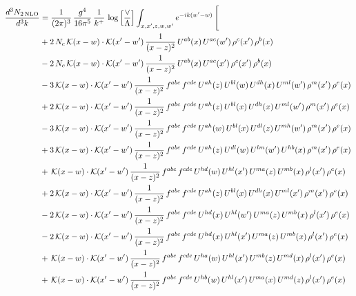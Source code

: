 \documentclass[9pt]{article}
\numberwithin{equation}{section}
\begin{document}
\begin{align}
\frac{d^{3}N_{2\,\mathrm{NLO}}}{d^{3}k} & = \frac{1}{(2\pi)^{3}}\,\frac{g^{4}}{16\pi^{5}}\,\frac{1}{k^{+}}\,\log\Big[\frac{\vee}{\Lambda}\Big]\int_{x,x',z,w,w'}e^{-ik(w'-w)}\,\Bigg[
\notag\\ &+2\,N_{c}\,\mathcal{K}(x-w)\cdot\mathcal{K}(x'-w')\,\frac{1}{(x-z)^{2}}\,U^{ab}(x)\,U^{ac}(w')\,\rho^{c}(x')\,\rho^{b}(x)\notag\\
&-2\,N_{c}\,\mathcal{K}(x-w)\cdot\mathcal{K}(x'-w')\,\frac{1}{(x-z)^{2}}\,U^{ab}(x)\,U^{ac}(x')\,\rho^{c}(x')\,\rho^{b}(x)\notag\\
&-3\,\mathcal{K}(x-w)\cdot\mathcal{K}(x'-w')\,\frac{1}{(x-z)^{2}}\,f^{abc}\,f^{cde}\,U^{ah}(z)\,U^{bl}(w)\,U^{dh}(x)\,U^{ml}(w')\,\rho^{m}(x')\,\rho^{e}(x)\notag\\
&+2\,\mathcal{K}(x-w)\cdot\mathcal{K}(x'-w')\,\frac{1}{(x-z)^{2}}\,f^{abc}\,f^{cde}\,U^{ah}(z)\,U^{bl}(x)\,U^{dh}(x)\,U^{ml}(w')\,\rho^{m}(x')\,\rho^{e}(x)\notag\\
&-3\,\mathcal{K}(x-w)\cdot\mathcal{K}(x'-w')\,\frac{1}{(x-z)^{2}}\,f^{abc}\,f^{cde}\,U^{ah}(w)\,U^{bl}(x)\,U^{dl}(z)\,U^{mh}(w')\,\rho^{m}(x')\,\rho^{e}(x)\notag\\
&+3\,\mathcal{K}(x-w)\cdot\mathcal{K}(x'-w')\,\frac{1}{(x-z)^{2}}\,f^{abc}\,f^{cde}\,U^{ah}(z)\,U^{dl}(w)\,U^{lm}(w')\,U^{hb}(x)\,\rho^{m}(x')\,\rho^{e}(x)\notag\\
&+\,\mathcal{K}(x-w)\cdot\mathcal{K}(x'-w')\,\frac{1}{(x-z)^{2}}\,f^{abc}\,f^{cde}\,U^{hd}(w)\,U^{hl}(x')\,U^{ma}(z)\,U^{mb}(x)\,\rho^{l}(x')\,\rho^{e}(x)\notag\\
&+2\,\mathcal{K}(x-w)\cdot\mathcal{K}(x'-w')\,\frac{1}{(x-z)^{2}}\,f^{abc}\,f^{cde}\,U^{ah}(z)\,U^{bl}(x)\,U^{dh}(x)\,U^{ml}(x')\,\rho^{m}(x')\,\rho^{e}(x)\notag\\
&-2\,\mathcal{K}(x-w)\cdot\mathcal{K}(x'-w')\,\frac{1}{(x-z)^{2}}\,f^{abc}\,f^{cde}\,U^{hd}(x)\,U^{hl}(w')\,U^{ma}(z)\,U^{mb}(x)\,\rho^{l}(x')\,\rho^{e}(x)\notag\\
&-2\,\mathcal{K}(x-w)\cdot\mathcal{K}(x'-w')\,\frac{1}{(x-z)^{2}}\,f^{abc}\,f^{cde}\,U^{hd}(x)\,U^{hl}(x')\,U^{ma}(z)\,U^{mb}(x)\,\rho^{l}(x')\,\rho^{e}(x)\notag\\
&+\,\mathcal{K}(x-w)\cdot\mathcal{K}(x'-w')\,\frac{1}{(x-z)^{2}}\,f^{abc}\,f^{cde}\,U^{ha}(w)\,U^{hl}(x')\,U^{mb}(z)\,U^{md}(x)\,\rho^{l}(x')\,\rho^{e}(x)\notag\\
&+\,\mathcal{K}(x-w)\cdot\mathcal{K}(x'-w')\,\frac{1}{(x-z)^{2}}\,f^{abc}\,f^{cde}\,U^{hb}(w)\,U^{hl}(x')\,U^{ma}(x)\,U^{md}(z)\,\rho^{l}(x')\,\rho^{e}(x)\notag\\

\end{align}
\end{document}
